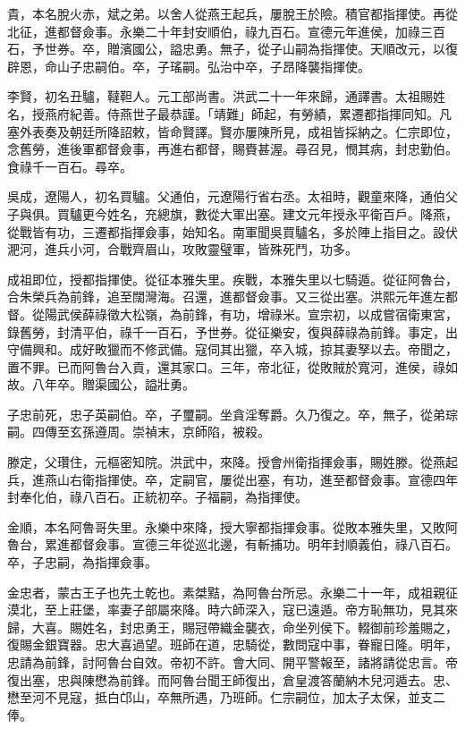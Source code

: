 \begin{pinyinscope}
貴，本名脫火赤，斌之弟。以舍人從燕王起兵，屢脫王於險。積官都指揮使。再從北征，進都督僉事。永樂二十年封安順伯，祿九百石。宣德元年進侯，加祿三百石，予世券。卒，贈濱國公，謚忠勇。無子，從子山嗣為指揮使。天順改元，以復辟恩，命山子忠嗣伯。卒，子瑤嗣。弘治中卒，子昂降襲指揮使。

李賢，初名丑驢，韃靼人。元工部尚書。洪武二十一年來歸，通譯書。太祖賜姓名，授燕府紀善。侍燕世子最恭謹。「靖難」師起，有勞績，累遷都指揮同知。凡塞外表奏及朝廷所降詔敕，皆命賢譯。賢亦屢陳所見，成祖皆採納之。仁宗即位，念舊勞，進後軍都督僉事，再進右都督，賜賚甚渥。尋召見，憫其病，封忠勤伯。食祿千一百石。尋卒。

吳成，遼陽人，初名買驢。父通伯，元遼陽行省右丞。太祖時，觀童來降，通伯父子與俱。買驢更今姓名，充總旗，數從大軍出塞。建文元年授永平衛百戶。降燕，從戰皆有功，三遷都指揮僉事，始知名。南軍聞吳買驢名，多於陣上指目之。設伏淝河，進兵小河，合戰齊眉山，攻敗靈璧軍，皆殊死鬥，功多。

成祖即位，授都指揮使。從征本雅失里。疾戰，本雅失里以七騎遁。從征阿魯台，合朱榮兵為前鋒，追至闊灣海。召還，進都督僉事。又三從出塞。洪熙元年進左都督。從陽武侯薛祿徵大松嶺，為前鋒，有功，增祿米。宣宗初，以成嘗宿衛東宮，錄舊勞，封清平伯，祿千一百石，予世券。從征樂安，復與薛祿為前鋒。事定，出守備興和。成好畋獵而不修武備。寇伺其出獵，卒入城，掠其妻孥以去。帝聞之，置不罪。已而阿魯台入貢，還其家口。三年，帝北征，從敗賊於寬河，進侯，祿如故。八年卒。贈渠國公，謚壯勇。

子忠前死，忠子英嗣伯。卒，子璽嗣。坐貪淫奪爵。久乃復之。卒，無子，從弟琮嗣。四傳至玄孫遵周。崇禎末，京師陷，被殺。

滕定，父瓚住，元樞密知院。洪武中，來降。授會州衛指揮僉事，賜姓滕。從燕起兵，進燕山右衛指揮使。卒，定嗣官，屢從出塞，有功，進至都督僉事。宣德四年封奉化伯，祿八百石。正統初卒。子福嗣，為指揮使。

金順，本名阿魯哥失里。永樂中來降，授大寧都指揮僉事。從敗本雅失里，又敗阿魯台，累進都督僉事。宣德三年從巡北邊，有斬捕功。明年封順義伯，祿八百石。卒，子忠嗣，為指揮僉事。

金忠者，蒙古王子也先土乾也。素桀黠，為阿魯台所忌。永樂二十一年，成祖親征漠北，至上莊堡，率妻子部屬來降。時六師深入，寇已遠遁。帝方恥無功，見其來歸，大喜。賜姓名，封忠勇王，賜冠帶織金襲衣，命坐列侯下。輟御前珍羞賜之，復賜金銀寶器。忠大喜過望。班師在道，忠騎從，數問寇中事，眷寵日隆。明年，忠請為前鋒，討阿魯台自效。帝初不許。會大同、開平警報至，諸將請從忠言。帝復出塞，忠與陳懋為前鋒。而阿魯台聞王師復出，倉皇渡答蘭納木兒河遁去。忠、懋至河不見寇，抵白邙山，卒無所遇，乃班師。仁宗嗣位，加太子太保，並支二俸。


\end{pinyinscope}
